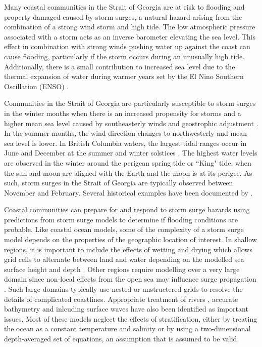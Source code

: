 \documentclass[pdftex,10pt]{article}
\begin{document}
Many coastal communities in the Strait of Georgia are at risk to flooding and property damaged caused by storm surges, a natural hazard arising from the combination of a strong wind storm and high tide. The low atmospheric pressure associated with a storm acts as an inverse barometer elevating the sea level. This effect in combination with strong winds pushing water up against the coast can cause flooding, particularly if the storm occurs during an unusually high tide.  Additionally, there is a small contribution to increased sea level due to the thermal expansion of water during warmer years set by the El Nino Southern Oscillation (ENSO) \citep{abeys2011extreme}.

Communities in the Strait of Georgia are particularly susceptible to storm surges in the winter months when there is an increased propensity for storms and a higher mean sea level caused by southeasterly winds and geostrophic adjustment \citep{danard2003storm}. In the summer months, the wind direction changes to northwesterly and mean sea level is lower. In British Columbia waters, the largest tidal ranges occur in June and December at the summer and winter solstices \citep{thomson1981oceanography}. The highest water levels are observed in the winter around the perigean spring tide or ``King" tide, when the sun and moon are aligned with the Earth and the moon is at its perigee. As such, storm surges in the Strait of Georgia are typically observed between November and February. Several historical examples have been documented by \citet{forseth2006adaptation}. 

Coastal communities can prepare for and respond to storm surge hazards using predictions from storm surge models to determine if flooding conditions are probable. Like coastal ocean models, some of the complexity of a storm surge model depends on the properties of the geographic location of interest. In shallow regions, it is important to include the effects of wetting and drying which allows grid cells to alternate between land and water depending on the modelled sea surface height and depth \citep{hubbert1999storm, weisberg2006hurricane}.  Other regions require modelling over a very large domain since non-local effects from the open sea may influence surge propagation \citep{weisberg2006hurricane, lane2009verification}. Such large domains typically use nested or unstructered grids to resolve the details of complicated coastlines. Appropriate treatment of rivers \citep{flather1994storm}, accurate bathymetry and inlcuding surface waves \citep{xu2010storm} have also been identified as important issues.  Most of these models neglect the effects of stratification, either by treating the ocean as a constant temperature and salinity or by using a two-dimensional depth-averaged set of equations, an assumption that is assumed to be valid. 
\end{document}
